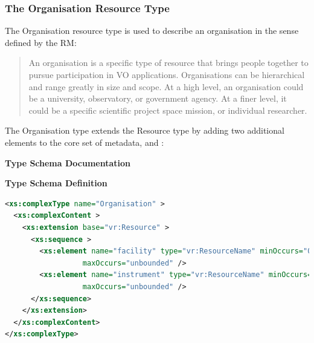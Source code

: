 \documentclass[11pt,a4paper]{ivoa}
\begin{document}
\subsubsection{The Organisation Resource Type}


The Organisation resource type is used to describe an organisation in
the sense defined by the RM:


\begin{quotation}
An organisation is a specific type of resource that brings people
together to pursue participation in VO applications.  Organisations
can be hierarchical and range greatly in size and scope.  At a high
level, an organisation could be a university, observatory, or
government agency.  At a finer level, it could be a specific
scientific project space mission, or individual researcher.  
\end{quotation}


The Organisation type extends the Resource type by adding two additional
elements to the core set of metadata,  and
:


\begingroup
      	\renewcommand*\descriptionlabel[1]{%
      	\hbox to 5.5em{\emph{#1}\hfil}}\vspace{2ex}\noindent\textbf{ Type Schema Documentation}




\vspace{1ex}\noindent\textbf{ Type Schema Definition}

\begin{lstlisting}[language=XML,basicstyle=\footnotesize]
<xs:complexType name="Organisation" >
  <xs:complexContent >
    <xs:extension base="vr:Resource" >
      <xs:sequence >
        <xs:element name="facility" type="vr:ResourceName" minOccurs="0"
                  maxOccurs="unbounded" />
        <xs:element name="instrument" type="vr:ResourceName" minOccurs="0"
                  maxOccurs="unbounded" />
      </xs:sequence>
    </xs:extension>
  </xs:complexContent>
</xs:complexType>
\end{lstlisting}
\end{document}
